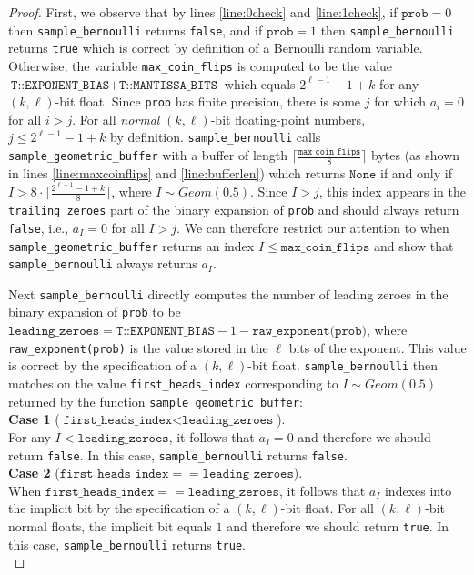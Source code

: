 \documentclass[11pt,a4paper]{article}
\theoremstyle{definition}
\begin{document}
\begin{proof}
First, we observe that by lines \ref{line:0check} and \ref{line:1check}, if $\texttt{prob} = 0$ then \texttt{sample\_bernoulli} returns \texttt{false}, and if $\texttt{prob} = 1$ then \texttt{sample\_bernoulli} returns \texttt{true} which is correct by definition of a Bernoulli random variable. Otherwise, the variable \texttt{max\_coin\_flips} is computed to be the value $\texttt{T::EXPONENT\_BIAS} + \texttt{T::MANTISSA\_BITS}$ which equals $2^{\ell - 1} - 1 + k$ for any $(k,\ell)$-bit float. Since \texttt{prob} has finite precision, there is some $j$ for which $a_i = 0$ for all $i > j$. For all \emph{normal} $(k,\ell)$-bit floating-point numbers, $j \le 2^{\ell - 1} - 1 + k$ by definition. \texttt{sample\_bernoulli} calls \texttt{sample\_geometric\_buffer} with a buffer of length $\lceil \frac{\texttt{max\_coin\_flips}}{8}\rceil$ bytes (as shown in lines \ref{line:maxcoinflips} and \ref{line:bufferlen}) which returns  $\texttt{None}$ if and only if $I > {8\cdot \lceil \frac{2^{\ell - 1} -1 + k}{8}\rceil}$, where $I \sim Geom(0.5)$. Since $I > j$, this index appears in the \texttt{trailing\_zeroes} part of the binary expansion of \texttt{prob} and should always return \texttt{false}, i.e., $a_I = 0$ for all $I > j$. We can therefore restrict our attention to when \texttt{sample\_geometric\_buffer} returns an index $I \le \texttt{max\_coin\_flips}$ and show that \texttt{sample\_bernoulli} always returns $a_I$.

Next \texttt{sample\_bernoulli} directly computes the number of leading zeroes in the binary expansion of \texttt{prob} to be $\texttt{leading\_zeroes} = \texttt{T::EXPONENT\_BIAS} - 1 - \texttt{raw\_exponent(prob)}$, where \texttt{raw\_exponent(prob)} is the value stored in the $\ell$ bits of the exponent. This value is correct by the specification of a $(k,\ell)$-bit float.  \texttt{sample\_bernoulli} then matches on the value \texttt{first\_heads\_index} corresponding to $I \sim Geom(0.5)$ returned by the function \texttt{sample\_geometric\_buffer}: \\

\noindent\textbf{Case 1} ($\texttt{first\_heads\_index} < \texttt{leading\_zeroes}$). \\
\noindent For any $I < \texttt{leading\_zeroes}$, it follows that $a_I = 0$ and therefore we should return \texttt{false}. In this case, \texttt{sample\_bernoulli} returns \texttt{false}.\\

\noindent\textbf{Case 2} ($\texttt{first\_heads\_index} == \texttt{leading\_zeroes}$). \\
\noindent When $\texttt{first\_heads\_index} == \texttt{leading\_zeroes}$, it follows that $a_I$ indexes into the implicit bit by the specification of a $(k,\ell)$-bit float. For all $(k,\ell)$-bit normal floats, the implicit bit equals $1$ and therefore we should return \texttt{true}. In this case, \texttt{sample\_bernoulli} returns \texttt{true}.\\


\end{proof}
\end{document}
